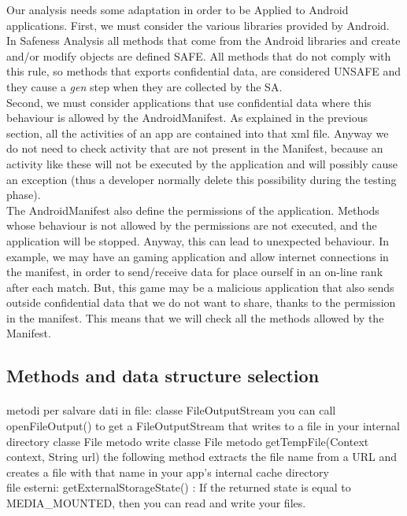\documentclass[letterpaper,twocolumn,10pt]{article}
\begin{document}
Our analysis needs some adaptation in order to be Applied to Android applications. First, we must consider the various libraries provided by Android. In Safeness Analysis all methods that come from the Android libraries and create and/or modify objects are defined SAFE. All methods that do not comply with this rule, so methods that exports confidential data, are considered UNSAFE and they cause a \emph{gen} step when they are collected by the SA.\\
Second, we must consider applications that use confidential data where this behaviour is allowed by the AndroidManifest. As explained in the previous section, all the activities of an app are contained into that xml file. Anyway we do not need to check activity that are not present in the Manifest, because an activity like these will not be executed by the application and will possibly cause an exception (thus a developer normally delete this possibility during the testing phase).\\
The AndroidManifest also define the permissions of the application. Methods whose behaviour is not allowed by the permissions are not executed, and the application will be stopped. Anyway, this can lead to unexpected behaviour. In example, we may have an gaming application and allow internet connections in the manifest, in order to send/receive data for place ourself in an on-line rank after each match. But, this game may be a malicious application that also sends outside confidential data that we do not want to share, thanks to the permission in the manifest. This means that we will check all the methods allowed by the Manifest.

\subsection{Methods and data structure selection}
\paragraph{}
metodi per salvare dati in file:
classe FileOutputStream 
you can call openFileOutput() to get a FileOutputStream that writes to a file in your internal directory
classe File
metodo write
classe File
metodo getTempFile(Context context, String url)
the following method extracts the file name from a URL and creates a file with that name in your app's internal cache directory \\

file esterni:
getExternalStorageState() : If the returned state is equal to MEDIA\_MOUNTED, then you can read and write your files. \\
\end{document}
